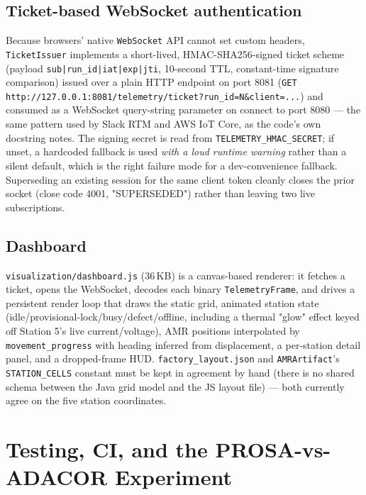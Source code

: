 \documentclass[twocolumn,10pt,a4paper]{article}
\newcommand{\code}[1]{\texttt{\small #1}}
\newcommand{\file}[1]{\texttt{#1}}
\begin{document}
\subsection{Ticket-based WebSocket authentication}
Because browsers' native \code{WebSocket} API cannot set custom headers, \code{TicketIssuer} implements a short-lived, HMAC-SHA256-signed ticket scheme (payload \code{sub|run\_id|iat|exp|jti}, 10-second TTL, constant-time signature comparison) issued over a plain HTTP endpoint on port 8081 (\code{GET http://127.0.0.1:8081/telemetry/ticket?run\_id=N\&client=...}) and consumed as a WebSocket query-string parameter on connect to port 8080 --- the same pattern used by Slack RTM and AWS IoT Core, as the code's own docstring notes. The signing secret is read from \code{TELEMETRY\_HMAC\_SECRET}; if unset, a hardcoded fallback is used \emph{with a loud runtime warning} rather than a silent default, which is the right failure mode for a dev-convenience fallback. Superseding an existing session for the same client token cleanly closes the prior socket (close code 4001, "SUPERSEDED") rather than leaving two live subscriptions.

\subsection{Dashboard}
\file{visualization/dashboard.js} (36\,KB) is a canvas-based renderer: it fetches a ticket, opens the WebSocket, decodes each binary \code{TelemetryFrame}, and drives a persistent render loop that draws the static grid, animated station state (idle/provisional-lock/busy/defect/offline, including a thermal "glow" effect keyed off Station 5's live current/voltage), AMR positions interpolated by \code{movement\_progress} with heading inferred from displacement, a per-station detail panel, and a dropped-frame HUD. \file{factory\_layout.json} and \code{AMRArtifact}'s \code{STATION\_CELLS} constant must be kept in agreement by hand (there is no shared schema between the Java grid model and the JS layout file) --- both currently agree on the five station coordinates.

\section{Testing, CI, and the PROSA-vs-ADACOR Experiment}
\end{document}
